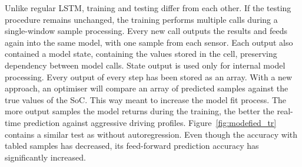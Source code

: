 Unlike regular LSTM, training and testing differ from each other.
If the testing procedure remains unchanged, the training performs multiple calls during a single-window sample processing.
Every new call outputs the results and feeds again into the same model, with one sample from each sensor.
Each output also contained a model state, containing the values stored in the cell, preserving dependency between model calls.
State output is used only for internal model processing.
Every output of every step has been stored as an array.
With a new approach, an optimiser will compare an array of predicted samples against the true values of the SoC.
This way meant to increase the model fit process.
The more output samples the model returns during the training, the better the real-time prediction against aggressive driving profiles.
\mbox{Figure~\ref{fig:modefied_tr}} contains a similar test as without autoregression.
Even though the accuracy with tabled samples has decreased, its feed-forward prediction accuracy has significantly increased.
